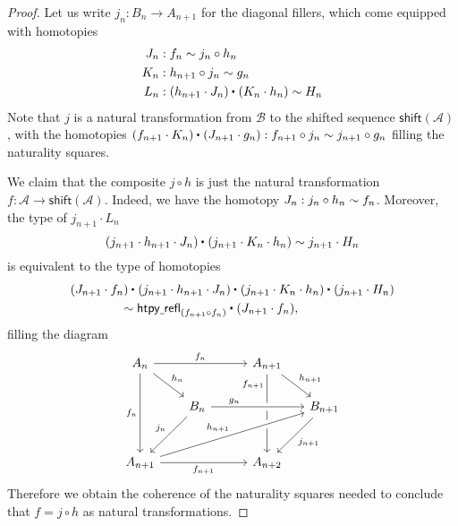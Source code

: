 \begin{proof}
Let us write $j_n:B_n\to A_{n+1}$ for the diagonal fillers, which come equipped with homotopies
\begin{align*}
J_n & : f_n\htpy j_n\circ h_n \\
K_n & : h_{n+1}\circ j_n \htpy g_n \\
L_n & : \ct{(h_{n+1}\cdot J_n)}{(K_n\cdot h_n)} \htpy H_n
\end{align*}
Note that $j$ is a natural transformation from $\mathcal{B}$ to the shifted sequence $\mathsf{shift}(\mathcal{A})$, with the homotopies $\ct{(f_{n+1}\cdot K_n)}{(J_{n+1}\cdot g_n)}: f_{n+1}\circ j_n \htpy j_{n+1}\circ g_n$ filling the naturality squares.

We claim that the composite $j\circ h$ is just the natural transformation $f:\mathcal{A}\to \mathsf{shift}(\mathcal{A})$. Indeed, we have the homotopy $J_n : j_n\circ h_n\sim f_n$. Moreover, the type of $j_{n+1}\cdot L_n$
\begin{equation*}
\ct{(j_{n+1}\cdot h_{n+1}\cdot J_n)}{(j_{n+1}\cdot K_n\cdot h_n)} \htpy j_{n+1}\cdot H_n
\end{equation*}
is equivalent to the type of homotopies
\begin{align*}
& \ct{(J_{n+1}\cdot f_n)}{(j_{n+1}\cdot h_{n+1} \cdot J_n)}{(j_{n+1}\cdot K_n\cdot h_n)}{(j_{n+1}\cdot H_n)} \\
& \qquad\qquad \htpy \ct{\mathsf{htpy\usc{}refl}_{(f_{n+1}\circ f_n)}}{(J_{n+1}\cdot f_n)},
\end{align*}
filling the diagram
\begin{equation*}
\begin{tikzcd}
A_n \arrow[rr,"f_n"] \arrow[dr,"h_n"] \arrow[dd,swap,"f_n"] &[-1em] & A_{n+1} \arrow[dd,swap,"f_{n+1}" very near start] \arrow[dr,"h_{n+1}"] &[-1em] \\
& B_n \arrow[dl,swap,"j_n"] \arrow[rr,crossing over,"g_n" near start] & & B_{n+1} \arrow[dl,"j_{n+1}"] \\[1em]
A_{n+1} \arrow[urrr,crossing over,"h_{n+1}"] \arrow[rr,swap,"f_{n+1}"] & \phantom{A_{n+2}} & A_{n+2} & \phantom{A_{n+2}}
\end{tikzcd}
\end{equation*}
Therefore we obtain the coherence of the naturality squares needed to conclude that $f=j\circ h$ as natural transformations.


\end{proof}
